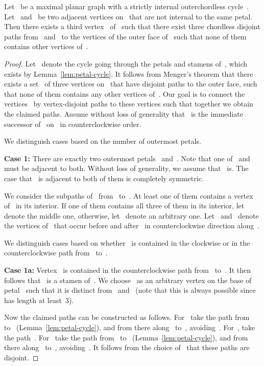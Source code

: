 \documentclass{llncs}
\begin{document}
\begin{lemma}
  \label{lem:disjoint-paths}
  Let~ be a maximal planar graph with a strictly internal outerchordless
  cycle~.  Let~ and~ be two adjacent
  vertices on~ that are not internal to the same petal.
Then there exists a third vertex~ of~ such that there exist three
  chordless disjoint paths from~ and~ to the vertices of the
  outer face of~ such that none of them contains other vertices
  of~.
\end{lemma}

\begin{proof}
  Let~ denote the cycle going through the petals and
  stamens of~, which exists by Lemma~\ref{lem:petal-cycle}.  It
  follows from Menger's theorem that there exists a set~ of three
  vertices on~ that have disjoint paths to the outer face,
  such that none of them contains any other vertices of~.
  Our goal is to connect the vertices~ by vertex-disjoint paths
  to these vertices such that together we obtain the claimed paths.
  Assume without loss of generality that~ is the immediate
  successor of~ on~ in counterclockwise order.

  We distinguish cases based on the number of outermost petals.

  \textbf{Case 1:} There are exactly two outermost petals~ and~.
  Note that one of~ and~ must be adjacent to both.  Without loss
  of generality, we assume that~ is.  The case that~ is adjacent
  to both of them is completely symmetric.

  We consider the subpaths of~ from~ to~.  At least
  one of them contains a vertex of~ in its interior.  If one of
  them contains all three of them in its interior, let~ denote the
  middle one, otherwise, let~ denote an arbitrary one.  Let~
  and~ denote the vertices of~ that occur before
  and after~ in counterclockwise direction along~.

  We distinguish cases based on whether~ is contained in the
  clockwise or in the counterclockwise path from~ to~.

  \textbf{Case 1a:} Vertex~ is contained in the counterclockwise
  path from~ to~.  It then follows that~ is a stamen
  of~. We choose~ as an arbitrary vertex on the base of
  petal~ such that it is distinct from~ and~ (note that this
  is always possible since~ has length at least~3).

  Now the claimed paths can be constructed as follows.  For~ take
  the path from~ to~ (Lemma~\ref{lem:petal-cycle}), and from
  there along~ to~, avoiding~.  For~, take the
  path~.  For~ take the path from~ to~
  (Lemma~\ref{lem:petal-cycle}), and from there along~
  to~, avoiding~.  It follows from the choice of~ that these
  paths are disjoint.


\end{proof}
\end{document}

